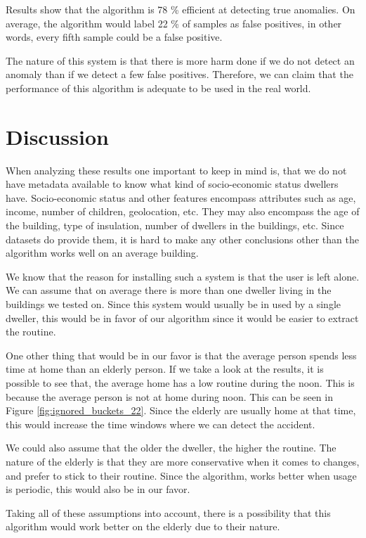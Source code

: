 Results show that the algorithm is 78 \% efficient at detecting true anomalies. 
On average, the algorithm would label 22 \% of samples as false positives, 
in other words, every fifth sample could be a false positive. 

The nature of this system is that there is more harm done if we do not detect an anomaly than if we detect a few false positives. 
Therefore, we can claim that the performance of this algorithm is adequate to be used in the real world. 

\section{Discussion}

When analyzing these results one important to keep in mind is,
that we do not have metadata available to know what kind of
socio-economic status dwellers have.
Socio-economic status and other features encompass attributes such as age, income, number of children, geolocation, etc.
They may also encompass the age of the building, type of insulation, number of dwellers in the buildings, etc.
Since datasets do provide them,
it is hard to make any other conclusions other than the algorithm works well on an average building.

We know that the reason for installing such a system is that the user is left alone.
We can assume that on average there is more than one dweller living in the buildings we tested on.
Since this system would usually be in used by a single dweller,
this would be in favor of our algorithm since it would be 
easier to extract the routine.

One other thing that would be in our favor is that the average person spends less time at home than an elderly person. 
If we take a look at the results, it is possible to see that,
the average home has a low routine during the noon. 
This is because the average person is not at home during noon.
This can be seen in Figure \ref{fig:ignored_buckets_22}.
Since the elderly are usually home at that time, this would 
increase the time windows where we can detect the accident.

We could also assume that the older the dweller, the higher the routine. 
The nature of the elderly is that they are more conservative when it comes to changes, and prefer to stick to their routine.
Since the algorithm, works better when usage is periodic, this would also be in our favor. 

Taking all of these assumptions into account, 
there is a possibility that this algorithm would work 
better on the elderly due to their nature.

